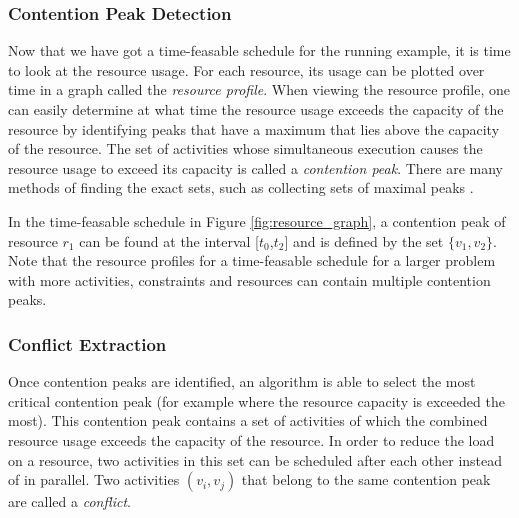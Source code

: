 \documentclass{article}
\theoremstyle{definition}
\newcommand{\inputtikz}[1]{}
\newcommand{\TODO}[1]{{\color{red}\textbf{TODO: #1}}}
\begin{document}
\begin{comment}
\TODO{wat is handiger voor het uitleggen, infeasible profile alleen of de vergelijking van de schedules?}
\begin{figure}[h]
	\centering
	\inputtikz{schedule_comparison}
	\caption{Two different schedules for the running example and their resource profiles. }
	\label{fig:resource_graph}
\end{figure}
\end{comment}

\subsubsection{Contention Peak Detection}
Now that we have got a time-feasable schedule for the running example, it is time to look at the resource usage. For each resource, its usage can be plotted over time in a graph called the \emph{resource profile}. When viewing the resource profile, one can easily determine at what time the resource usage exceeds the capacity of the resource by identifying peaks that have a maximum that lies above the capacity of the resource. The set of activities whose simultaneous execution causes the resource usage to exceed its capacity is called a \emph{contention peak}. There are many methods of finding the exact sets, such as collecting sets of maximal peaks \cite{lombardi10}.

In the time-feasable schedule in Figure \ref{fig:resource_graph}, a contention peak of resource $r_1$ can be found at the interval [$t_0$,$t_2$] and is defined by the set $\{v_1,v_2\}$. Note that the resource profiles for a time-feasable schedule for a larger problem with more activities, constraints and resources can contain multiple contention peaks.

\subsubsection{Conflict Extraction}
\label{text:conflict}
Once contention peaks are identified, an algorithm is able to select the most critical contention peak (for example where the resource capacity is exceeded the most). This contention peak contains a set of activities of which the combined resource usage exceeds the capacity of the resource. In order to reduce the load on a resource, two activities in this set can be scheduled after each other instead of in parallel. Two activities $(v_i,v_j)$ that belong to the same contention peak are called a \emph{conflict}.
\end{document}
